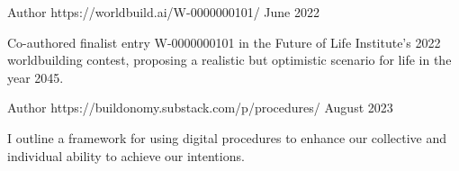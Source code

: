 


\begin{cventries}


\cventry
{Author} %
{} %
{https://worldbuild.ai/W-0000000101/} %
{June 2022} %
{ %
\begin{cvitems}
\item {Co-authored finalist entry W-0000000101 in the Future of Life Institute's 2022 worldbuilding contest, proposing a realistic but optimistic scenario for life in the year 2045.}
\end{cvitems}
}

\cventry
{Author} %
{} %
{https://buildonomy.substack.com/p/procedures/} %
{August 2023} %
{
\begin{cvitems}
\item {I outline a framework for using digital procedures to enhance our collective and individual ability to achieve our intentions.}
\end{cvitems}
}



\end{cventries}
